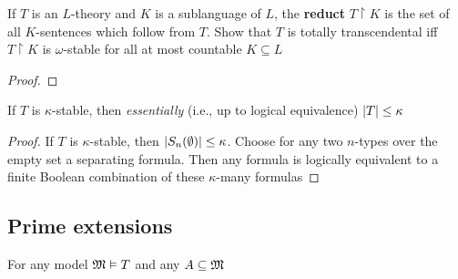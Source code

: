 \documentclass[11pt]{article}
\begin{document}
\begin{exercise}
\label{ex5.2.5}
If \(T\) is an \(L\)-theory and \(K\) is a sublanguage of \(L\), the \textbf{reduct} \(T\restriction K\) is
the set of all \(K\)-sentences which follow from \(T\). Show that \(T\) is totally transcendental
iff \(T\restriction K\) is \(\omega\)-stable for all at most countable \(K\subseteq L\)
\end{exercise}

\begin{proof}

\end{proof}

\begin{exercise}
\label{ex5.2.6}
If \(T\) is \(\kappa\)-stable, then \emph{essentially} (i.e., up to logical equivalence) \(\abs{T}\le\kappa\)
\end{exercise}

\begin{proof}
If \(T\) is \(\kappa\)-stable, then \(\abs{S_n(\emptyset)}\le\kappa\). Choose for any two \(n\)-types over the empty set a
separating formula. Then any formula is logically equivalent to a finite Boolean combination of
these \(\kappa\)-many formulas
\end{proof}

\subsection{Prime extensions}
\label{sec:org0392639}
For any model \(\mathfrak{M}\vDash T\) and any \(A\subseteq\mathfrak{M}\)

  \begin{center}\end{center}
\end{document}
